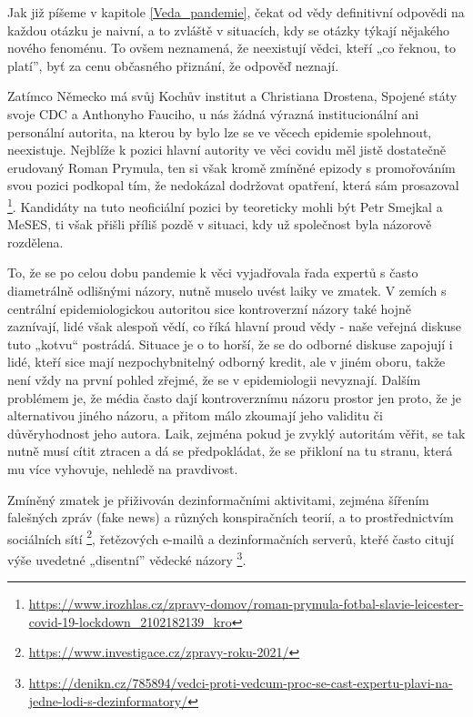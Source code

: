 Jak již píšeme v kapitole \ref{Veda_pandemie}, čekat od vědy definitivní odpovědi na každou otázku je naivní, a to zvláště v situacích, kdy se otázky týkají nějakého nového fenoménu. To ovšem neznamená, že neexistují vědci, kteří „co řeknou, to platí”, byť za cenu občasného přiznání, že odpověď neznají. 

Zatímco Německo má svůj Kochův institut a Christiana Drostena, Spojené státy svoje CDC a Anthonyho Fauciho, u nás žádná výrazná institucionální ani personální autorita, na kterou by bylo lze se ve věcech epidemie spolehnout, neexistuje. Nejblíže k pozici hlavní autority ve věci covidu měl jistě dostatečně erudovaný Roman Prymula, ten si však kromě zmíněné epizody s promořováním svou pozici podkopal tím, že nedokázal dodržovat opatření, která sám prosazoval \footnote{\url{https://www.irozhlas.cz/zpravy-domov/roman-prymula-fotbal-slavie-leicester-covid-19-lockdown_2102182139_kro}}. Kandidáty na tuto neoficiální pozici by teoreticky mohli být Petr Smejkal a MeSES, ti však přišli příliš pozdě v situaci, kdy už společnost byla názorově rozdělena.

To, že se po celou dobu pandemie k věci vyjadřovala řada expertů s často diametrálně odlišnými názory, nutně muselo uvést laiky ve zmatek. V zemích s centrální epidemiologickou autoritou sice kontroverzní názory také hojně zaznívají, lidé však alespoň vědí, co říká hlavní proud vědy - naše veřejná diskuse tuto „kotvu“ postrádá. Situace je o to horší, že se do odborné diskuse zapojují i lidé, kteří sice mají nezpochybnitelný odborný kredit, ale v jiném oboru, takže není vždy na první pohled zřejmé, že se v epidemiologii nevyznají. Dalším problémem je, že média často dají kontroverznímu názoru prostor jen proto, že je alternativou jiného názoru, a přitom málo zkoumají jeho validitu či důvěryhodnost jeho autora. Laik, zejména pokud je zvyklý autoritám věřit, se tak nutně musí cítit ztracen a dá se předpokládat, že se přikloní na tu stranu, která mu více vyhovuje, nehledě na pravdivost.

Zmíněný zmatek je přiživován dezinformačními aktivitami, zejména šířením falešných zpráv (fake news) a různých konspiračních teorií, a to prostřednictvím sociálních sítí \footnote{\url{https://www.investigace.cz/zpravy-roku-2021/}}, řetězových e-mailů a dezinformačních serverů, kteřé často citují výše uvedetné „disentní” vědecké názory \footnote{\url{https://denikn.cz/785894/vedci-proti-vedcum-proc-se-cast-expertu-plavi-na-jedne-lodi-s-dezinformatory/}}.

